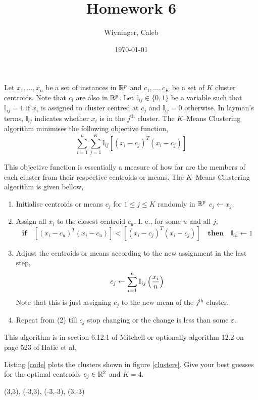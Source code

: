\documentclass{homework}
\author{Wiyninger, Caleb}
\title{Homework 6}
\date{\today}
\begin{document}
 \maketitle

Let $x_{1}, \ldots, x_n$ be a set of instances in $\mathbb{R}^p$ and
$c_1, \ldots, c_K$ be a set of $K$ cluster centroids. Note that $c_i$
are also in $\mathbb{R}^p$. Let $\mathbb{I}_{ij} \in \{0, 1\}$ be a variable
such that $\mathbb{I}_{ij} = 1$ if $x_i$ is assigned to cluster
centred at $c_j$ and $\mathbb{I}_{ij} = 0$ otherwise. In layman's
terms, $\mathbb{I}_{ij}$ indicates whether $x_i$ is in the
$j^\text{th}$ cluster. The $K$--Means Clustering algorithm minimises
the following objective function,
\[
  \sum_{i=1}^n \sum_{j=1}^K \mathbb{I}_{ij} [(x_i - c_j)^T(x_i - c_j)]
\]

This objective function is essentially a measure of how far are the
members of each cluster from their respective centroids or means. The
$K$--Means Clustering algorithm is given bellow,

\begin{enumerate}
  \item Initialise centroids or means $c_j$ for $1 \leq j \leq K$
        randomly in $\mathbb{R}^p$ \ie $c_j \leftarrow x_j$.
  \item Assign all $x_i$ to the closest centroid $c_u$. I. e., for
        some $u$ and all $j$,
        \[
          \mathbf{if}\quad
          [(x_i - c_u)^T(x_i - c_u)]<[(x_i - c_j)^T(x_i - c_j)]
          \quad \mathbf{then}\quad
          \mathbb{I}_{iu}\leftarrow 1
        \]
  \item Adjust the centroids or means according to the new
        assignment in the last step,
        \[
          c_j \leftarrow \sum_{i=1}^{n}\mathbb{I}_{ij}\left(\frac{x_i}{n}\right)
        \]
        Note that this is just assigning $c_j$ to the new mean of the
        $j^\text{th}$ cluster.
  \item Repeat from (2) till $c_j$ stop changing or the change
        is less than some $\varepsilon$.
\end{enumerate}
This algorithm is in section 6.12.1 of Mitchell or optionally
algorithm 12.2 on page 523 of Hatie et al.

\question Listing \ref{code} plots the clusters shown in figure
\ref{clusters}. Give your best guesses for the optimal centroids
$c_j\in \mathbb{R}^2$ and $K=4$.

\begin{sol}
    (3,3), (-3,3), (-3,-3), (3,-3)
\end{sol}
\end{document}
